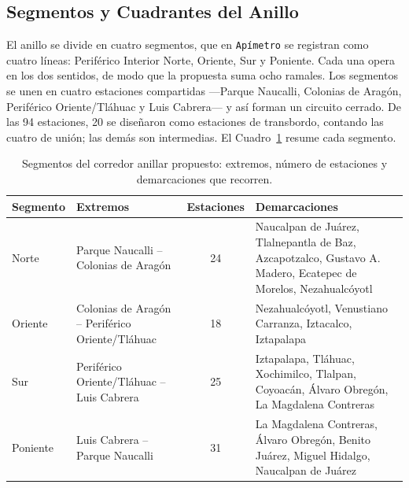\subsection{Segmentos y Cuadrantes del Anillo}
\label{subsec:corredor-anillar-cuadrantes}

El anillo se divide en cuatro segmentos, que en \texttt{Apímetro} se registran
como cuatro líneas: Periférico Interior Norte, Oriente, Sur y Poniente. Cada
una opera en los dos sentidos, de modo que la propuesta suma ocho ramales. Los
segmentos se unen en cuatro estaciones compartidas ---Parque Naucalli,
Colonias de Aragón, Periférico Oriente/Tláhuac y Luis Cabrera--- y así forman
un circuito cerrado. De las 94 estaciones, 20 se diseñaron como estaciones de
transbordo, contando las cuatro de unión; las demás son intermedias. El
Cuadro~\ref{tab:segmentos-anillo} resume cada segmento.

\begin{table}[H]
    \centering
    \caption[Segmentos del corredor anillar]{%
    Segmentos del corredor anillar propuesto: extremos, número de
    estaciones y demarcaciones que recorren.}
    \label{tab:segmentos-anillo}
    \small
    \begin{tabular}{|l|p{4.4cm}|c|p{5.4cm}|}
        \hline
        \textbf{Segmento} & \textbf{Extremos} & \textbf{Estaciones} &
        \textbf{Demarcaciones} \\
        \hline
        Norte & Parque Naucalli -- Colonias de Aragón & 24 &
            Naucalpan de Juárez, Tlalnepantla de Baz, Azcapotzalco,
            Gustavo A. Madero, Ecatepec de Morelos, Nezahualcóyotl \\
        \hline
        Oriente & Colonias de Aragón -- Periférico Oriente/Tláhuac & 18 &
            Nezahualcóyotl, Venustiano Carranza, Iztacalco, Iztapalapa \\
        \hline
        Sur & Periférico Oriente/Tláhuac -- Luis Cabrera & 25 &
            Iztapalapa, Tláhuac, Xochimilco, Tlalpan, Coyoacán,
            Álvaro Obregón, La Magdalena Contreras \\
        \hline
        Poniente & Luis Cabrera -- Parque Naucalli & 31 &
            La Magdalena Contreras, Álvaro Obregón, Benito Juárez,
            Miguel Hidalgo, Naucalpan de Juárez \\
        \hline
    \end{tabular}
\end{table}

